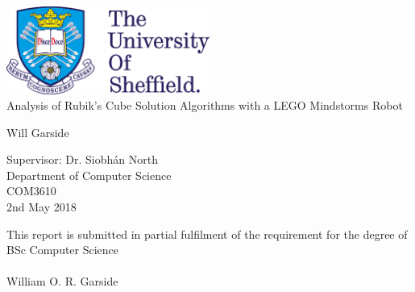 \begin{titlepage}
	{
		
	    \centering
	   	\vspace*{\fill}
	   	
		\includegraphics[width=0.5\textwidth]{Resources/Images/imgTUosLogo.png} \\
	   	\vspace{1.5cm}
	    {\Huge Analysis of Rubik's Cube Solution Algorithms with a LEGO Mindstorms Robot} 
	    
		\vspace{1.5cm}
	    
	    {\huge Will Garside}
	    \vspace{2cm}
	    
	    {\Large Supervisor: Dr. Siobh\'{a}n North} \\
	    {\Large Department of Computer Science} \\
	    {\Large COM3610} \\
	    {\Large 2nd May 2018} 
	    
	    \vspace{0.8cm}
	    
		{\Large This report is submitted in partial fulfilment of the requirement for the degree of BSc Computer Science} \\
		{\Large {}} \\
		{\Large William O. R. Garside} \\
	
	    \vspace*{\fill}
	}
\end{titlepage}